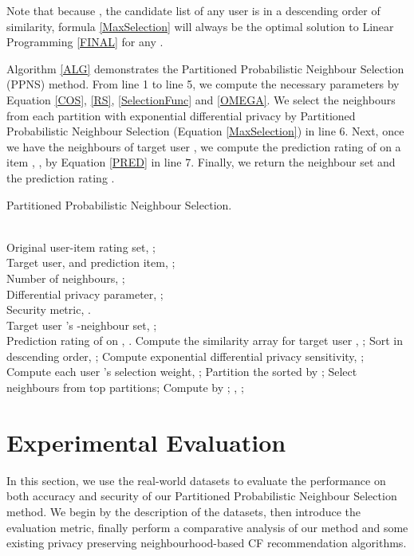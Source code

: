 \documentclass[11pt]{article}
\begin{document}
Note that because  , the candidate list of any user is in a descending order of similarity, formula \eqref{MaxSelection} will always be the optimal solution to Linear Programming \eqref{FINAL} for any .

Algorithm \ref{ALG} demonstrates the Partitioned Probabilistic Neighbour Selection (PPNS) method. From line 1 to line 5, we compute the necessary parameters by Equation \eqref{COS}, \eqref{RS}, \eqref{SelectionFunc} and \eqref{OMEGA}. We select the  neighbours from each partition with exponential differential privacy by Partitioned Probabilistic Neighbour Selection (Equation \eqref{MaxSelection}) in line 6. Next, once we have the  neighbours of target user , we compute the prediction rating of  on a item , , by Equation \eqref{PRED} in line 7. Finally, we return the neighbour set  and the prediction rating .
\begin{algorithm}[ht]
\caption{Partitioned Probabilistic Neighbour Selection.}
\label{ALG}
\begin{algorithmic}[1]
\REQUIRE ~~\\
Original user-item rating set, ;\\
Target user,  and prediction item, ;\\
Number of neighbours, ;\\
Differential privacy parameter, ;\\
Security metric, .
\ENSURE ~~\\
Target user 's -neighbour set, ;\\
Prediction rating of  on , .
\STATE Compute the similarity array for target user , ;
\STATE Sort  in descending order, ;
\STATE Compute exponential differential privacy sensitivity, ;
\STATE Compute each user 's selection weight, ;
\STATE Partition the sorted  by ;
\STATE Select  neighbours from top  partitions;
\STATE Compute  by ;
\RETURN , ;
\end{algorithmic}
\end{algorithm}


\section{Experimental Evaluation}
\label{PE}
In this section, we use the real-world datasets to evaluate the performance on both accuracy and security of our Partitioned Probabilistic Neighbour Selection method. We begin by the description of the datasets, then introduce the evaluation metric, finally perform a comparative analysis of our method and some existing privacy preserving neighbourhood-based CF recommendation algorithms.
\end{document}
